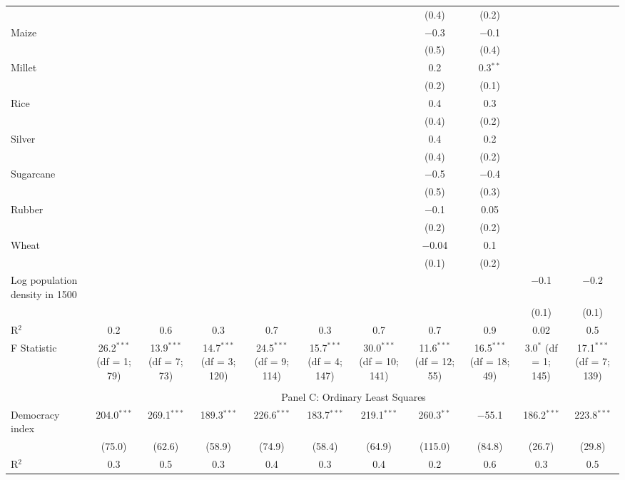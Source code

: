 {\begin{table}[]
\begin{threeparttable}
\begin{tabular}{@{\extracolsep{0pt}}lcccccccccc}
  &  &  &  &  &  &  & (0.4) & (0.2) &  &  \\ 
  Maize &  &  &  &  &  &  & $-$0.3 & $-$0.1 &  &  \\ 
  &  &  &  &  &  &  & (0.5) & (0.4) &  &  \\ 
  Millet &  &  &  &  &  &  & 0.2 & 0.3$^{**}$ &  &  \\ 
  &  &  &  &  &  &  & (0.2) & (0.1) &  &  \\ 
  Rice &  &  &  &  &  &  & 0.4 & 0.3 &  &  \\ 
  &  &  &  &  &  &  & (0.4) & (0.2) &  &  \\ 
  Silver &  &  &  &  &  &  & 0.4 & 0.2 &  &  \\ 
  &  &  &  &  &  &  & (0.4) & (0.2) &  &  \\ 
  Sugarcane &  &  &  &  &  &  & $-$0.5 & $-$0.4 &  &  \\ 
  &  &  &  &  &  &  & (0.5) & (0.3) &  &  \\ 
  Rubber &  &  &  &  &  &  & $-$0.1 & 0.05 &  &  \\ 
  &  &  &  &  &  &  & (0.2) & (0.2) &  &  \\ 
  Wheat &  &  &  &  &  &  & $-$0.04 & 0.1 &  &  \\ 
  &  &  &  &  &  &  & (0.1) & (0.2) &  &  \\ 
  Log population density in 1500 &  &  &  &  &  &  &  &  & $-$0.1 & $-$0.2 \\ 
  &  &  &  &  &  &  &  &  & (0.1) & (0.1) \\ 
  R$^{2}$ & 0.2 & 0.6 & 0.3 & 0.7 & 0.3 & 0.7 & 0.7 & 0.9 & 0.02 & 0.5 \\ 
F Statistic & 26.2$^{***}$ (df = 1; 79) & 13.9$^{***}$ (df = 7; 73) & 14.7$^{***}$ (df = 3; 120) & 24.5$^{***}$ (df = 9; 114) & 15.7$^{***}$ (df = 4; 147) & 30.0$^{***}$ (df = 10; 141) & 11.6$^{***}$ (df = 12; 55) & 16.5$^{***}$ (df = 18; 49) & 3.0$^{*}$ (df = 1; 145) & 17.1$^{***}$ (df = 7; 139) \\ 
\hline \\[-1.8ex] 
  & \multicolumn{10}{c}{Panel C: Ordinary Least Squares} \\
 Democracy index & 204.0$^{***}$ & 269.1$^{***}$ & 189.3$^{***}$ & 226.6$^{***}$ & 183.7$^{***}$ & 219.1$^{***}$ & 260.3$^{**}$ & $-$55.1 & 186.2$^{***}$ & 223.8$^{***}$ \\ 
  & (75.0) & (62.6) & (58.9) & (74.9) & (58.4) & (64.9) & (115.0) & (84.8) & (26.7) & (29.8) \\ 
  R$^{2}$ & 0.3 & 0.5 & 0.3 & 0.4 & 0.3 & 0.4 & 0.2 & 0.6 & 0.3 & 0.5 \\ 

\end{tabular}
\end{threeparttable}
\end{table}}
